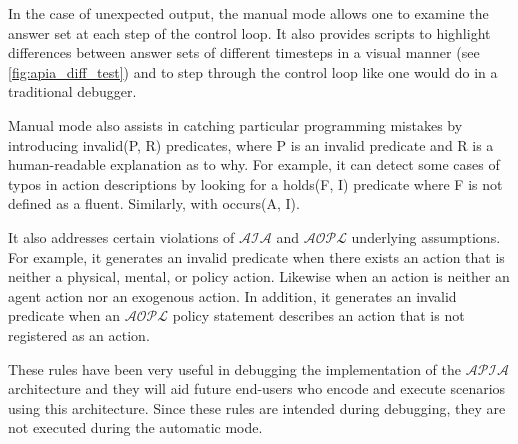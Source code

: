 In the case of unexpected output, the manual mode allows one to examine the answer set at each step of the control loop.
It also provides scripts to highlight differences between answer sets of different timesteps in a visual manner (see \cref{fig:apia_diff_test}) and to step through the control loop like one would do in a traditional debugger.

Manual mode also assists in catching particular programming mistakes by introducing invalid(P, R) predicates, where P is an invalid predicate and R is a human-readable explanation as to why.
For example, it can detect some cases of typos in action descriptions by looking for a holds(F, I) predicate where F is not defined as a fluent.
Similarly, with occurs(A, I).

It also addresses certain violations of $\mathcal{AIA}$ and $\mathcal{AOPL}$ underlying assumptions.
For example, it generates an invalid predicate when there exists an action that is neither a physical, mental, or policy action.
Likewise when an action is neither an agent action nor an exogenous action.
In addition, it generates an invalid predicate when an $\mathcal{AOPL}$ policy statement describes an action that is not registered as an action.

These rules have been very useful in debugging the implementation of the $\mathcal{APIA}$ architecture and they will aid future end-users who encode and execute scenarios using this architecture.
Since these rules are intended during debugging, they are not executed during the automatic mode.
